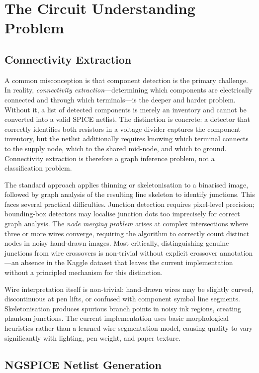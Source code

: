 \section{The Circuit Understanding Problem}

\subsection{Connectivity Extraction}

A common misconception is that component detection is the primary challenge. In reality, \emph{connectivity extraction}—determining which components are electrically connected and through which terminals—is the deeper and harder problem. Without it, a list of detected components is merely an inventory and cannot be converted into a valid SPICE netlist. The distinction is concrete: a detector that correctly identifies both resistors in a voltage divider captures the component inventory, but the netlist additionally requires knowing which terminal connects to the supply node, which to the shared mid-node, and which to ground. Connectivity extraction is therefore a graph inference problem, not a classification problem.

The standard approach applies thinning or skeletonisation to a binarised image, followed by graph analysis of the resulting line skeleton to identify junctions. This faces several practical difficulties. Junction detection requires pixel-level precision; bounding-box detectors may localise junction dots too imprecisely for correct graph analysis. The \emph{node merging problem} arises at complex intersections where three or more wires converge, requiring the algorithm to correctly count distinct nodes in noisy hand-drawn images. Most critically, distinguishing genuine junctions from wire crossovers is non-trivial without explicit crossover annotation—an absence in the Kaggle dataset that leaves the current implementation without a principled mechanism for this distinction.

Wire interpretation itself is non-trivial: hand-drawn wires may be slightly curved, discontinuous at pen lifts, or confused with component symbol line segments. Skeletonisation produces spurious branch points in noisy ink regions, creating phantom junctions. The current implementation uses basic morphological heuristics rather than a learned wire segmentation model, causing quality to vary significantly with lighting, pen weight, and paper texture.

\subsection{NGSPICE Netlist Generation}

